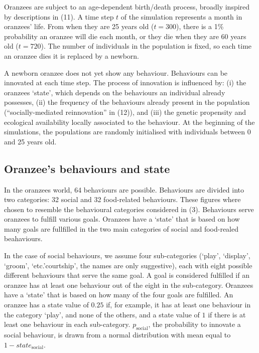 \documentclass[9pt,twocolumn,twoside,]{pnas-new}
\begin{document}
Oranzees are subject to an age-dependent birth/death process, broadly
inspired by descriptions in (11). A time step \(t\) of the simulation
represents a month in oranzees' life. From when they are 25 years old
(\(t=300\)), there is a 1\% probability an oranzee will die each month,
or they die when they are 60 years old (\(t=720\)). The number of
individuals in the population is fixed, so each time an oranzee dies it
is replaced by a newborn.

A newborn oranzee does not yet show any behaviour. Behaviours can be
innovated at each time step. The process of innovation is influenced by:
(i) the oranzees `state', which depends on the behaviours an individual
already possesses, (ii) the frequency of the behaviours already present
in the population (``socially-mediated reinnovation'' in (12)), and
(iii) the genetic propensity and ecological availability locally
associated to the behaviour. At the beginning of the simulations, the
populations are randomly initialised with individuals between 0 and 25
years old.

\subsection*{Oranzee's behaviours and state}\label{format}

In the oranzees world, 64 behaviours are possible. Behaviours are
divided into two categories: 32 social and 32 food-related behaviours.
These figures where chosen to resemble the behavioural categories
considered in (3). Behaviours serve oranzees to fulfill various goals.
Oranzees have a `state' that is based on how many goals are fullfilled
in the two main categories of social and food-realed beahaviours.

In the case of social behaviours, we assume four sub-categories (`play',
`display', `groom', `etc.'courtship', the names are only suggestive),
each with eight possible different behaviours that serve the same goal.
A goal is considered fulfilled if an oranzee has at least one behaviour
out of the eight in the sub-category. Oranzees have a `state' that is
based on how many of the four goals are fulfilled. An oranzee has a
state value of \(0.25\) if, for example, it has at least one behaviour
in the category `play', and none of the others, and a state value of
\(1\) if there is at least one behaviour in each sub-category.
\(p_\text{social}\), the probability to innovate a social behaviour, is
drawn from a normal distribution with mean equal to
\(1-state_\text{social}\).
\end{document}
